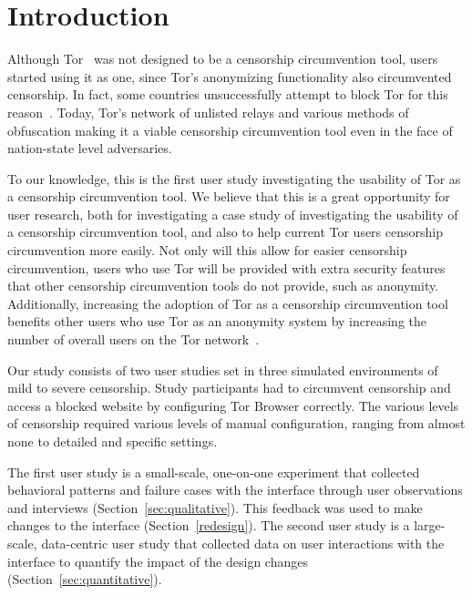 \documentclass[USenglish,oneside,twocolumn]{article}
\begin{document}


\maketitle

\section{Introduction}

Although Tor~\cite{dingledine2004tor} was not designed to be a censorship circumvention tool, users started
using it as one, since Tor's anonymizing functionality also circumvented censorship. In fact, some countries unsuccessfully attempt to block Tor for this reason~\cite{winter2012great}. Today, Tor's network of unlisted relays and various methods of obfuscation making it a viable censorship circumvention tool even in the face of nation-state level adversaries.
 
To our knowledge, this is the first user study investigating the usability of Tor as a 
censorship circumvention tool. We believe that this is a great opportunity for user research, both for investigating a case study of investigating the usability of a censorship circumvention tool, and also to help current Tor users censorship circumvention more easily. Not only will this allow for easier censorship circumvention, users who use Tor will be provided with extra security features that other censorship circumvention tools do not provide, such as anonymity. Additionally, increasing the adoption of Tor as a censorship circumvention tool benefits other users who use Tor as an anonymity system by increasing the number of overall users on the Tor network~\cite{dingledine2006anonymity}.

Our study consists of two user studies set in three simulated environments
of mild to severe censorship.
Study participants had to circumvent censorship and access a blocked website
by configuring Tor Browser correctly.
The various levels of censorship required various levels of manual configuration,
ranging from almost none to detailed and specific settings.

The first user study is a small-scale, one-on-one experiment that collected 
behavioral patterns and failure cases with the interface through user observations
and interviews (Section~\ref{sec:qualitative}). This feedback was used to make changes to the interface (Section~\ref{redesign}). The second user study is a large-scale, data-centric user study
that collected data on user interactions with the interface to quantify the impact of the design changes (Section~\ref{sec:quantitative}).
\end{document}
